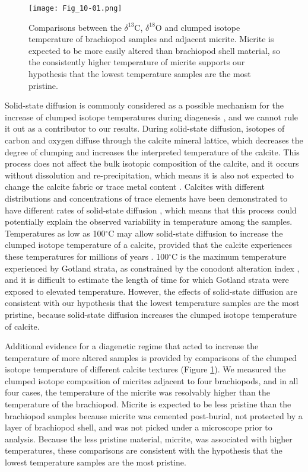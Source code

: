 \documentclass[5p, authoryear]{elsarticle}
\begin{document}
\begin{figure}[b]
\centering
\texttt{[image: Fig\_10-01.png]}
\caption{Comparisons between the $\delta^{13}$C, $\delta^{18}$O and clumped isotope temperature of brachiopod samples and adjacent micrite. Micrite is expected to be more easily altered than brachiopod shell material, so the consistently higher temperature of micrite supports our hypothesis that the lowest temperature samples are the most pristine.}
\label{comparisons}
\end{figure}

Solid-state diffusion is commonly considered as a possible mechanism for the increase of clumped isotope temperatures during diagenesis \citep{Dennis2013, Huntington2011, Quade2013, VanDeVelde2013}, and we cannot rule it out as a contributor to our results. During solid-state diffusion, isotopes of carbon and oxygen diffuse through the calcite mineral lattice, which decreases the degree of clumping and increases the interpreted temperature of the calcite. This process does not affect the bulk isotopic composition of the calcite, and it occurs without dissolution and re-precipitation, which means it is also not expected to change the calcite fabric or trace metal content \citep{Eiler2011}. Calcites with different distributions and concentrations of trace elements have been demonstrated to have different rates of solid-state diffusion \citep{Passey2012}, which means that this process could potentially explain the observed variability in temperature among the samples. Temperatures as low as 100$^{\circ}$C may allow solid-state diffusion to increase the clumped isotope temperature of a calcite, provided that the calcite experiences these temperatures for millions of years \citep{Dennis2010}. 100$^{\circ}$C is the maximum temperature experienced by Gotland strata, as constrained by the conodont alteration index \citep{Jeppsson1983, Wenzel2000}, and it is difficult to estimate the length of time for which Gotland strata were exposed to elevated temperature. However, the effects of solid-state diffusion are consistent with our hypothesis that the lowest temperature samples are the most pristine, because solid-state diffusion increases the clumped isotope temperature of calcite. 

Additional evidence for a diagenetic regime that acted to increase the temperature of more altered samples is provided by comparisons of the clumped isotope temperature of different calcite textures (Figure \ref{comparisons}). We measured the clumped isotope composition of micrites adjacent to four brachiopods, and in all four cases, the temperature of the micrite was resolvably higher than the temperature of the brachiopod. Micrite is expected to be less pristine than the brachiopod samples because micrite was cemented post-burial, not protected by a layer of brachiopod shell, and was not picked under a microscope prior to analysis. Because the less pristine material, micrite, was associated with higher temperatures, these comparisons are consistent with the hypothesis that the lowest temperature samples are the most pristine.
\end{document}
